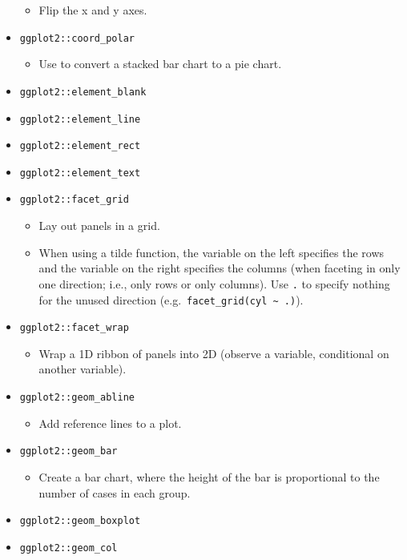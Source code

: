 \documentclass[
]{book}
\providecommand{\tightlist}{%
  \setlength{\itemsep}{0pt}\setlength{\parskip}{0pt}}
\begin{document}
\begin{itemize}
  \begin{itemize}
  \tightlist
  \item
    Flip the x and y axes.
  \end{itemize}
\item
  \texttt{ggplot2::coord\_polar}

  \begin{itemize}
  \tightlist
  \item
    Use to convert a stacked bar chart to a pie chart.
  \end{itemize}
\item
  \texttt{ggplot2::element\_blank}
\item
  \texttt{ggplot2::element\_line}
\item
  \texttt{ggplot2::element\_rect}
\item
  \texttt{ggplot2::element\_text}
\item
  \texttt{ggplot2::facet\_grid}

  \begin{itemize}
  \tightlist
  \item
    Lay out panels in a grid.
  \item
    When using a tilde function, the variable on the left specifies the rows and the variable on the right specifies the columns (when faceting in only one direction; i.e., only rows or only columns). Use \texttt{.} to specify nothing for the unused direction (e.g.~\texttt{facet\_grid(cyl\ \textasciitilde{}\ .)}).
  \end{itemize}
\item
  \texttt{ggplot2::facet\_wrap}

  \begin{itemize}
  \tightlist
  \item
    Wrap a 1D ribbon of panels into 2D (observe a variable, conditional on another variable).
  \end{itemize}
\item
  \texttt{ggplot2::geom\_abline}

  \begin{itemize}
  \tightlist
  \item
    Add reference lines to a plot.
  \end{itemize}
\item
  \texttt{ggplot2::geom\_bar}

  \begin{itemize}
  \tightlist
  \item
    Create a bar chart, where the height of the bar is proportional to the number of cases in each group.
  \end{itemize}
\item
  \texttt{ggplot2::geom\_boxplot}
\item
  \texttt{ggplot2::geom\_col}


\end{itemize}
\end{document}
